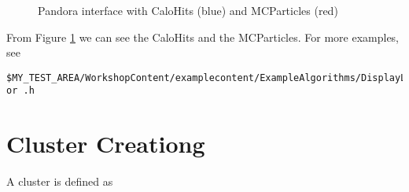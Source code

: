 \begin{figure}[h]
\centering
\caption{Pandora interface with CaloHits (blue) and MCParticles (red)}
\label{fig:calo_and_mc}
\end{figure}

From Figure \ref{fig:calo_and_mc} we can see the CaloHits and the MCParticles. For more examples, see 
\begin{verbatim}
$MY_TEST_AREA/WorkshopContent/examplecontent/ExampleAlgorithms/DisplayListsAlgorithm.cc or .h
\end{verbatim}

\section{Cluster Creationg} \label{sssec:cluster_creation}

A cluster is defined as

